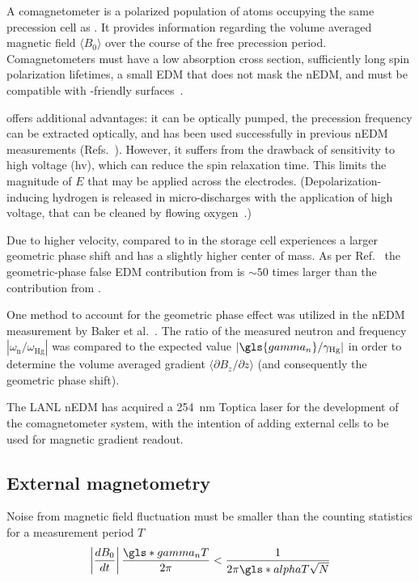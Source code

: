 A comagnetometer is a polarized population of atoms occupying the same precession cell as \ucn. It provides information regarding the volume averaged magnetic field $\langle B_0 \rangle$ over the course of the free precession period. Comagnetometers must have a low \ucn absorption cross section, sufficiently long spin polarization lifetimes, a small EDM that does not mask the nEDM, and must be compatible with \ucn-friendly surfaces~\cite{golubUCN}.

\hg offers additional advantages: it can be optically pumped, the precession frequency can be extracted optically, and has been used successfully in previous nEDM measurements (Refs.~\cite{BAK06, ABE20}). However, it suffers from the drawback of sensitivity to high voltage (\acrshort*{hv}), which can reduce the spin relaxation time. This limits the magnitude of $E$ that may be applied across the electrodes. (Depolarization-inducing hydrogen is released in micro-discharges with the application of high voltage, that can be cleaned by flowing oxygen~\cite{baker_apparatus_2014}.)

Due to higher velocity, compared to \ucn in the storage cell \hg experiences a larger geometric phase shift and has a slightly higher center of mass. As per Ref.~\cite{pendlebury_revised_2015} the geometric-phase false EDM contribution from \hg is $\sim 50$ times larger than the contribution from \ucn. 

One method to account for the geometric phase effect was utilized in the nEDM measurement by Baker et al.~\cite{BAK06}. The ratio of the measured neutron and \hg frequency $|\omega_\text{n}/\omega_\text{Hg}|$ was compared to the expected value $|\gls{gamma_n}/\gamma_\text{Hg}|$ in order to determine the volume averaged gradient $\langle \partial B_z/\partial z \rangle$ (and consequently the geometric phase shift).

The LANL nEDM has acquired a \qty{254}{\nano\meter} Toptica laser for the development of the comagnetometer system, with the intention of adding external \hg cells to be used for magnetic gradient readout.


\subsection
{
    External magnetometry
}


Noise from magnetic field fluctuation must be smaller than the counting statistics for a measurement period $T$~\cite{baker_apparatus_2014}
%
\begin{gather}
    \left| \frac{dB_0}{dt}\right| \frac{\gls*{gamma_n}T}{2\pi} < \frac{1}{2\pi\gls*{alpha}T\sqrt{N}}
\end{gather}
%


